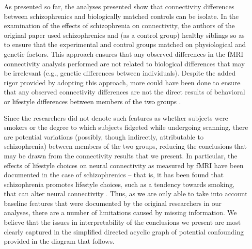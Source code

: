\documentclass[11pt]{article}
\begin{document}
As presented so far, the analyses presented show that connectivity differences
between schizophrenics and biologically matched controls can be isolate. In the
examination of the effects of schizophrenia on connectivity, the authors of the
original paper used schizophrenics and (as a control group) healthy siblings so
as to ensure that the experimental and control groups matched on physiological
and genetic factors. This approach ensures that any observed differences in the
fMRI connectivity analysis performed are not related to biological differences
that may be irrelevant (e.g., genetic differences between individuals). Despite
the added rigor provided by adopting this approach, more could have been done to
ensure that any observed connectivity differences are not the direct results of
behavioral or lifestyle differences between members of the two groups \cite{gur2010functional}. 

Since the researchers did not denote such features as whether subjects were smokers or the
degree to which subjects fidgeted while undergoing scanning, there are potential
variations (possibly, though indirectly, attributable to schizophrenia) between
members of the two groups, reducing the conclusions that may be drawn from the
connectivity results that we present. In particular, the effects of lifestyle
choices on neural connectivity as measured by fMRI have been documented in the
case of schizophrenics -- that is, it has been found that schizophrenia promotes
lifestyle choices, such as a tendency towards smoking, that can alter neural
connectivity \cite{leyba2008smoking}. Thus, as we are only able to take into 
account baseline features that were documented by the original researchers in 
our analyses, there are a number of limitations caused by missing information. 
We believe that the issues in interpretability of the conclusions we present 
are most clearly captured in the simplified directed acyclic graph of potential 
confounding provided in the diagram that follows. \\[5pt]
\end{document}

